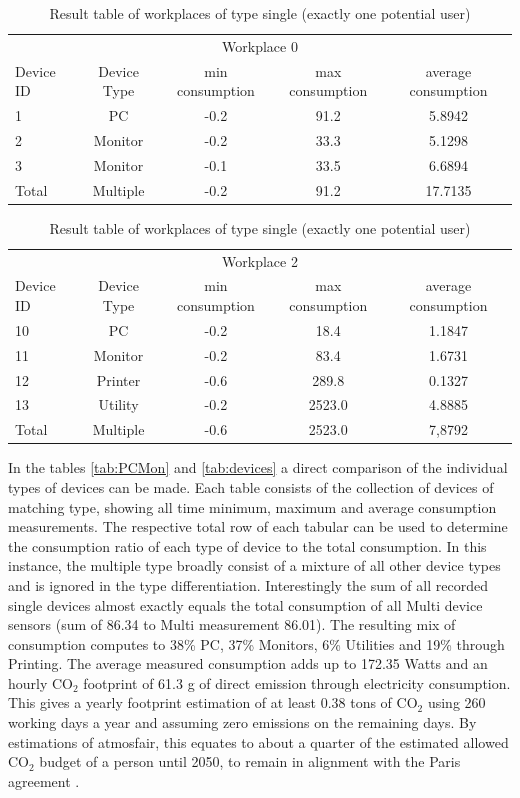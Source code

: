 \begin{table}[h]
	\begin{tabular}{l|c|c|c|c}
		\multicolumn{5}{c}{Workplace 0} \\
		Device ID & Device Type & min consumption & max consumption & average consumption\\
		1 & PC & -0.2 & 91.2 & 5.8942 \\
		2 & Monitor & -0.2 & 33.3 & 5.1298 \\
		3 & Monitor & -0.1 & 33.5 & 6.6894 \\
		\hline
		Total & Multiple & -0.2 & 91.2 & 17.7135
	\end{tabular}
	\begin{tabular}{l|c|c|c|c}
		\multicolumn{5}{c}{Workplace 2} \\
		Device ID & Device Type & min consumption & max consumption & average consumption\\
		10 & PC & -0.2 & 18.4 & 1.1847 \\
		11 & Monitor & -0.2 & 83.4 & 1.6731 \\
		12 & Printer & -0.6 & 289.8 & 0.1327 \\
		13 & Utility & -0.2 & 2523.0 & 4.8885 \\
		\hline 
		Total & Multiple & -0.6 & 2523.0 & 7,8792
	\end{tabular}
	\caption{Result table of workplaces of type single (exactly one potential user)}
	\label{tab:singleworkplace}
\end{table}
In the tables \ref{tab:PCMon} and \ref{tab:devices} a direct comparison of the individual types of devices can be made. Each table consists of the collection of devices of matching type, showing all time minimum, maximum and average consumption measurements. The respective total row of each tabular can be used to determine the consumption ratio of each type of device to the total consumption. In this instance, the multiple type broadly consist of a mixture of all other device types and is ignored in the type differentiation. Interestingly the sum of all recorded single devices almost exactly equals the total consumption of all Multi device sensors (sum of 86.34 to Multi measurement 86.01). The resulting mix of consumption computes to 38\% PC, 37\% Monitors, 6\% Utilities and 19\% through Printing. The average measured consumption adds up to 172.35 Watts and an hourly CO$_2$ footprint of 61.3 g of direct emission through electricity consumption. This gives a yearly footprint estimation of at least 0.38 tons of CO$_2$ using 260 working days a year and assuming zero emissions on the remaining days. By estimations of atmosfair, this equates to about a quarter of the estimated allowed CO$_2$ budget of a person until 2050, to remain in alignment with the Paris agreement \cite{co2_capita}. 
